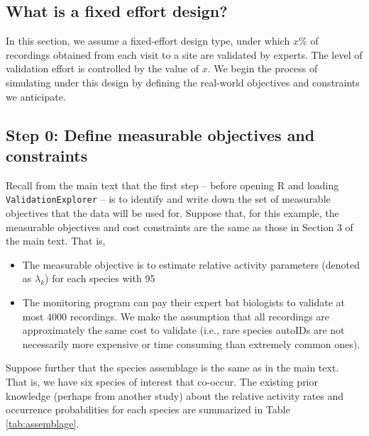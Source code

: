 \documentclass[
]{article}
\begin{document}
\subsection{What is a fixed effort design?}\label{what-is-a-fixed-effort-design}

In this section, we assume a fixed-effort design type, under which \(x\%\) of recordings obtained from each visit to a site are validated by experts. The level of validation effort is controlled by the value of \(x.\) We begin the process of simulating under this design by defining the real-world objectives and constraints we anticipate.

\subsection{\texorpdfstring{Step 0: Define measurable objectives and constraints \label{MO}}{Step 0: Define measurable objectives and constraints }}\label{step-0-define-measurable-objectives-and-constraints}

Recall from the main text that the first step -- before opening R and loading \texttt{ValidationExplorer} -- is to identify and write down the set of measurable objectives that the data will be used for. Suppose that, for this example, the measurable objectives and cost constraints are the same as those in Section 3 of the main text. That is,

\begin{itemize}
  \item The measurable objective is to estimate relative activity parameters (denoted as $\lambda_k$) for each species with 95%
\item The monitoring program can pay their expert bat biologists to validate at most 4000 recordings. We make the assumption that all recordings are approximately the same cost to validate (i.e., rare species autoIDs are not necessarily more expensive or time consuming than extremely common ones). 
\end{itemize}

Suppose further that the species assemblage is the same as in the main text. That is, we have six species of interest that co-occur. The existing prior knowledge (perhaps from another study) about the relative activity rates and occurrence probabilities for each species are summarized in Table \ref{tab:assemblage}.
\end{document}
